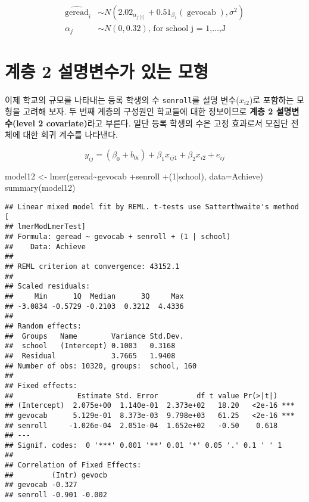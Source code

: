 \documentclass[
]{book}
\newenvironment{Shaded}{\begin{snugshade}}{\end{snugshade}}
\newcommand{\AttributeTok}[1]{\textcolor[rgb]{0.77,0.63,0.00}{#1}}
\newcommand{\DecValTok}[1]{\textcolor[rgb]{0.00,0.00,0.81}{#1}}
\newcommand{\FunctionTok}[1]{\textcolor[rgb]{0.00,0.00,0.00}{#1}}
\newcommand{\NormalTok}[1]{#1}
\newcommand{\OtherTok}[1]{\textcolor[rgb]{0.56,0.35,0.01}{#1}}
\newcommand{\SpecialCharTok}[1]{\textcolor[rgb]{0.00,0.00,0.00}{#1}}
\begin{document}
\[
\begin{aligned}
  \operatorname{\widehat{geread}}_{i}  &\sim N \left(2.02_{\alpha_{j[i]}} + 0.51_{\beta_{1}}(\operatorname{gevocab}), \sigma^2 \right) \\
    \alpha_{j}  &\sim N \left(0, 0.32 \right)
    \text{, for school j = 1,} \dots \text{,J}
\end{aligned}
\]

\hypertarget{uxacc4uxce35-2-uxc124uxba85uxbcc0uxc218uxac00-uxc788uxb294-uxbaa8uxd615}{%
\section{계층 2 설명변수가 있는 모형}\label{uxacc4uxce35-2-uxc124uxba85uxbcc0uxc218uxac00-uxc788uxb294-uxbaa8uxd615}}

이제 학교의 규모를 나타내는 등록 학생의 수 \texttt{senroll}를 설명 변수(\(x_{i2}\))로 포함하는 모형을 고려해 보자. 두 번째 계층의 구성원인 학교들에 대한 정보이므로 \textbf{계층 2 설명변수(level 2 covariate)}라고 부른다. 일단 등록 학생의 수은 고정 효과로서 모집단 전체에 대한 회귀 계수를 나타낸다.

\begin{equation}
y_{ij} = (\beta_0 + b_{0i}) + \beta_1 x_{ij1} + \beta_2 x_{i2} + e_{ij}
\label{eq:multimodel12}
\end{equation}

\begin{Shaded}
\begin{Highlighting}[]
\NormalTok{model12 }\OtherTok{\textless{}{-}} \FunctionTok{lmer}\NormalTok{(geread}\SpecialCharTok{\textasciitilde{}}\NormalTok{gevocab }\SpecialCharTok{+}\NormalTok{senroll }\SpecialCharTok{+}\NormalTok{(}\DecValTok{1}\SpecialCharTok{|}\NormalTok{school), }\AttributeTok{data=}\NormalTok{Achieve)}
\FunctionTok{summary}\NormalTok{(model12)}
\end{Highlighting}
\end{Shaded}

\begin{verbatim}
## Linear mixed model fit by REML. t-tests use Satterthwaite's method [
## lmerModLmerTest]
## Formula: geread ~ gevocab + senroll + (1 | school)
##    Data: Achieve
## 
## REML criterion at convergence: 43152.1
## 
## Scaled residuals: 
##     Min      1Q  Median      3Q     Max 
## -3.0834 -0.5729 -0.2103  0.3212  4.4336 
## 
## Random effects:
##  Groups   Name        Variance Std.Dev.
##  school   (Intercept) 0.1003   0.3168  
##  Residual             3.7665   1.9408  
## Number of obs: 10320, groups:  school, 160
## 
## Fixed effects:
##               Estimate Std. Error         df t value Pr(>|t|)    
## (Intercept)  2.075e+00  1.140e-01  2.373e+02   18.20   <2e-16 ***
## gevocab      5.129e-01  8.373e-03  9.798e+03   61.25   <2e-16 ***
## senroll     -1.026e-04  2.051e-04  1.652e+02   -0.50    0.618    
## ---
## Signif. codes:  0 '***' 0.001 '**' 0.01 '*' 0.05 '.' 0.1 ' ' 1
## 
## Correlation of Fixed Effects:
##         (Intr) gevocb
## gevocab -0.327       
## senroll -0.901 -0.002
\end{verbatim}
\end{document}

